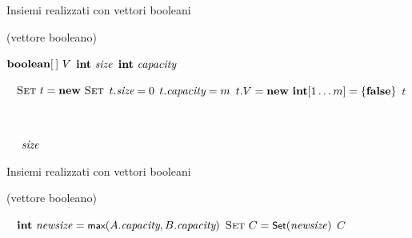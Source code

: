 \begin{frame}[shrink=12]{Insiemi realizzati con vettori booleani}

\vspace{-12pt}
\begin{Procedure}
\caption[A]{\Set (vettore booleano)}

\begin{multicols}{2}
$\BOOLEAN[\,]\ V$\;
$\INTEGER\ \setsize$\;
$\INTEGER\ \setcap$\;
\BlankLine

\alert{\Set}\ 
{
  $\Set\ t = \NEW\ \Set$\;
  $t.\textit{size} = 0$\;
  $t.\textit{capacity} = m$\;
	$t.V = \NEW\ \INTEGER[1 \ldots m] = \{ \FALSE \}$\;
  \Return $t$\;
}
\BlankLine

\alert{\BOOLEAN}\ 
{
}
\BlankLine

\alert{\INTEGER}\ 
{
  \Return\ $\textit{size}$\;
}
\BlankLine

{
}
\BlankLine

{
}
\end{multicols}
\BlankLine
\BlankLine
\end{Procedure}

\end{frame}

\begin{frame}[shrink=12]{Insiemi realizzati con vettori booleani}

\vspace{-12pt}
\begin{Procedure}
\caption[A]{\Set (vettore booleano)}

\alert{\Set}\ 
{
  $\INTEGER\ \mathit{newsize} = \MAX(A.\setcap, B.\setcap)$\;
  $\textsc{Set}\ C = \textsf{{\small Set}}(\mathit{newsize})$\;
  {
  }
  {
  }
  \Return $C$\;
}
\end{Procedure}

\end{frame}

